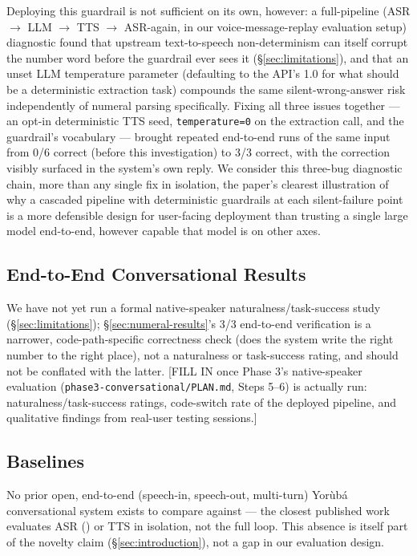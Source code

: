 Deploying this guardrail is not sufficient on its own, however: a
full-pipeline (ASR $\to$ LLM $\to$ TTS $\to$ ASR-again, in our
voice-message-replay evaluation setup) diagnostic found that upstream
text-to-speech non-determinism can itself corrupt the number word before
the guardrail ever sees it (\S\ref{sec:limitations}), and that an unset
LLM temperature parameter (defaulting to the API's 1.0 for what should be
a deterministic extraction task) compounds the same silent-wrong-answer
risk independently of numeral parsing specifically. Fixing all three
issues together --- an opt-in deterministic TTS seed, \texttt{temperature=0}
on the extraction call, and the guardrail's vocabulary --- brought
repeated end-to-end runs of the same input from 0/6 correct (before this
investigation) to 3/3 correct, with the correction visibly surfaced in the
system's own reply. We consider this three-bug diagnostic chain, more than
any single fix in isolation, the paper's clearest illustration of why a
cascaded pipeline with deterministic guardrails at each silent-failure
point is a more defensible design for user-facing deployment than trusting
a single large model end-to-end, however capable that model is on other
axes.

\subsection{End-to-End Conversational Results}
We have not yet run a formal native-speaker naturalness/task-success study
(\S\ref{sec:limitations}); \S\ref{sec:numeral-results}'s 3/3 end-to-end
verification is a narrower, code-path-specific correctness check (does the
system write the right number to the right place), not a naturalness or
task-success rating, and should not be conflated with the latter.
[FILL IN once Phase 3's native-speaker evaluation
(\texttt{phase3-conversational/PLAN.md}, Steps 5--6) is actually run:
naturalness/task-success ratings, code-switch rate of the deployed
pipeline, and qualitative findings from real-user testing sessions.]

\subsection{Baselines}
No prior open, end-to-end (speech-in, speech-out, multi-turn) Yor\`ub\'a
conversational system exists to compare against --- the closest published
work evaluates ASR (\citealp{owe-voice,tone-yoruba-asr}) or TTS in
isolation, not the full loop. This absence is itself part of the novelty
claim (\S\ref{sec:introduction}), not a gap in our evaluation design.
